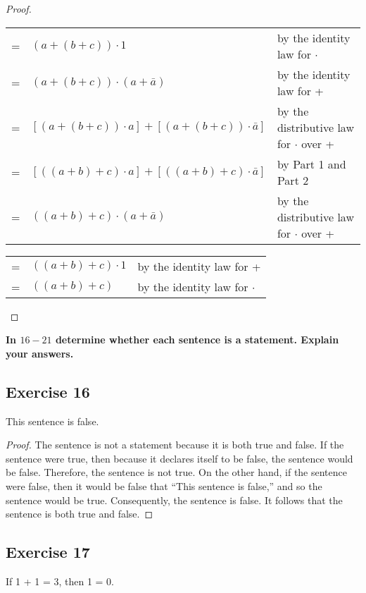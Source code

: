 \documentclass[14pt]{extarticle}
\newcommand{\cy}{\color{cyan}}
\begin{document}
\begin{proof}
  \begin{center}
    \begin{tabular}{cll}
      = & \((a + (b + c)) \cdot 1\)                                   & {\cy by the identity law for $\cdot$}            \\
      = & \((a + (b + c)) \cdot (a + \bar{a})\)                       & {\cy by the identity law for +}                  \\
      = & \([(a + (b + c)) \cdot a] + [(a + (b + c)) \cdot \bar{a}]\) & {\cy by the distributive law for $\cdot$ over +} \\
      = & \([((a + b) + c) \cdot a] + [((a + b) + c) \cdot \bar{a}]\) & {\cy by Part 1 and Part 2}                       \\
      = & \(((a + b) + c) \cdot (a + \bar{a})\)                       & {\cy by the distributive law for $\cdot$ over +}
    \end{tabular}
  \end{center}
  \begin{center}
    \begin{tabular}{cll}
      = & \(((a + b) + c) \cdot 1\) & {\cy by the identity law for +}       \\
      = & \(((a + b) + c)\)         & {\cy by the identity law for $\cdot$}
    \end{tabular}
  \end{center}

\end{proof}

{\bf \cy In $16-21$ determine whether each sentence is a statement. Explain your answers.}

\subsection{Exercise 16}
This sentence is false.

\begin{proof}
  The sentence is not a statement because it is both true and false. If the sentence were true, then because it declares
  itself to be false, the sentence would be false. Therefore, the sentence is not true. On the other hand, if the
  sentence were false, then it would be false that “This sentence is false,” and so the sentence would be true.
  Consequently, the sentence is false. It follows that the sentence is both true and false.
\end{proof}

\subsection{Exercise 17}
If 1 + 1 = 3, then 1 = 0.
\end{document}
